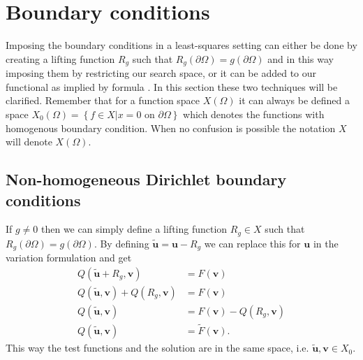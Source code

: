 \section{Boundary conditions} \label{BC}
Imposing the boundary conditions in a least-squares setting can either be done by creating a lifting function $R_g$ such that $R_g(\partial \Omega) = g(\partial\Omega)$ and in this way imposing them by restricting our search space, or it can be added to our functional as implied by formula . In this section these two techniques will be clarified. Remember that for a function space $X(\Omega)$ it can always be defined a space $X_0(\Omega) = \left\{ f\in X | x = 0 \text{ on } \partial \Omega \right\}$ which denotes the functions with homogenous boundary condition. When no confusion is possible the notation $X$ will denote $X(\Omega)$. 
\subsection{Non-homogeneous Dirichlet boundary conditions}
If $g \neq 0$ then we can simply define a lifting function $R_g \in X$ such that $R_g(\partial \Omega) = g(\partial \Omega)$. By defining $\tilde{\mathbf{u}}=\mathbf{u}-R_g$ we can replace this for $\mathbf{u}$ in the variation formulation and get 
\begin{align}
	Q(\tilde{\mathbf{u}}+R_g,\mathbf{v}) &= F(\mathbf{v}) \\
	Q(\tilde{\mathbf{u}},\mathbf{v})+Q(R_g,\mathbf{v}) &= F(\mathbf{v}) \\
	Q(\tilde{\mathbf{u}},\mathbf{v}) &= F(\mathbf{v}) - Q(R_g,\mathbf{v})\\
	Q(\tilde{\mathbf{u}},\mathbf{v}) &= \tilde{F}(\mathbf{v}).
	\label{eq:liftingFunc}
\end{align}
%
This way the test functions and the solution are in the same space, i.e. $\mathbf{\tilde u}, \mathbf{v} \in X_0$.
